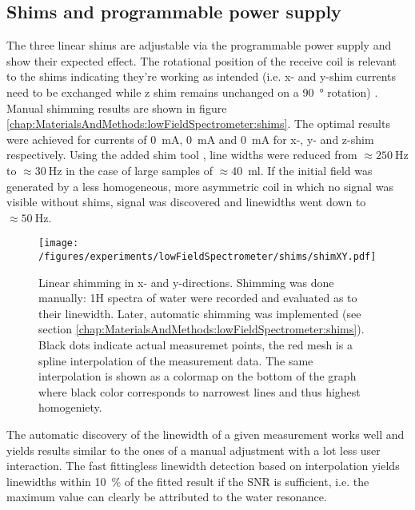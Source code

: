          \subsection{Shims and programmable power supply}
            The three linear shims are adjustable via the programmable power supply and show their expected effect. The rotational position of the receive coil is relevant to the shims indicating they're working as intended (i.e. x- and y-shim currents need to be exchanged while z shim remains unchanged on a \SI{90}{\degree} rotation) . Manual shimming results are shown in figure \ref{chap:MaterialsAndMethods:lowFieldSpectrometer:shims}. The optimal results were achieved for currents of \SI{0}{\milli\ampere},  \SI{0}{\milli\ampere} and \SI{0}{\milli\ampere} for x-, y- and z-shim respectively. Using the added shim tool , line widths were reduced from $\approx \SI{250}{\hertz}$ to $\approx \SI{30}{\hertz}$ in the case of large samples of $\approx $\SI{40}{\milli\litre}. If the initial field was generated by a less homogeneous, more asymmetric coil in which no signal was visible without shims, signal was discovered and linewidths went down to $\approx \SI{50}{\hertz}$.
            \begin{figure}
                \texttt{[image: /figures/experiments/lowFieldSpectrometer/shims/shimXY.pdf]}
                \caption[Manual low field shimming]{Linear shimming in x- and y-directions. Shimming was done manually: 1H spectra of water were recorded and evaluated as to their linewidth. Later, automatic shimming was implemented (see section \ref{chap:MaterialsAndMethods:lowFieldSpectrometer:shims}). Black dots indicate actual measuremet points, the red mesh is a spline interpolation of the measurement data. The same interpolation is shown as a colormap on the bottom of the graph where black color corresponds to narrowest lines and thus highest homogeniety.}
                \label{fig:results:lowFieldSpectrometer:shims}
            \end{figure}
            The automatic discovery of the linewidth of a given measurement works well and yields results similar to the ones of a manual adjustment with a lot less user interaction. The fast fittingless linewidth detection based on interpolation yields linewidths within \SI{10}{\percent} of the fitted result if the SNR is sufficient, i.e. the maximum value can clearly be attributed to the water resonance.
